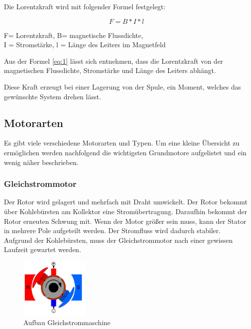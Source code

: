 Die Lorentzkraft wird mit folgender Formel festgelegt:

\begin{equation}
\label{eq:1}
 F = B * I * l
\end{equation}
\begin{center}
F= Lorentzkraft, B= magnetische Flussdichte, \\ I = Stromstärke, l = Länge des Leiters im Magnetfeld
\end{center}

Aus der Formel \ref{eq:1} lässt sich entnehmen, dass die Lorentzkraft von der magnetischen Flussdichte, Stromstärke und Länge des Leiters abhängt.

Diese Kraft erzeugt bei einer Lagerung von der Spule, ein Moment, welches das gewünschte System drehen lässt.

\subsection{Motorarten}
\label{sec:motorarten}

Es gibt viele verschiedene Motorarten und Typen. Um eine kleine Übersicht zu ermöglichen werden nachfolgend die wichtigsten Grundmotore aufgelistet und ein wenig näher beschrieben.

\subsubsection{Gleichstrommotor}
\label{sec:gleichstrommotor}

Der Rotor wird gelagert und mehrfach mit Draht umwickelt. Der Rotor bekommt über Kohlebürsten am Kollektor eine Stromübertragung. Daraufhin bekommt der Rotor erneuten Schwung mit. Wenn der Motor größer sein muss, kann der Stator in mehrere Pole aufgeteilt werden. Der Stromfluss wird dadurch stabiler. Aufgrund der Kohlebürsten, muss der Gleichstrommotor nach einer gewissen Laufzeit gewartet werden.

\begin{figure}[!ht]
\begin{center}
	\caption{Aufbau Gleichstrommaschine \label{fig:gleichstrommotor}}
	\includegraphics[width=0.3\textwidth]{Gleichstommaschine}
\end{center}
\end{figure}

